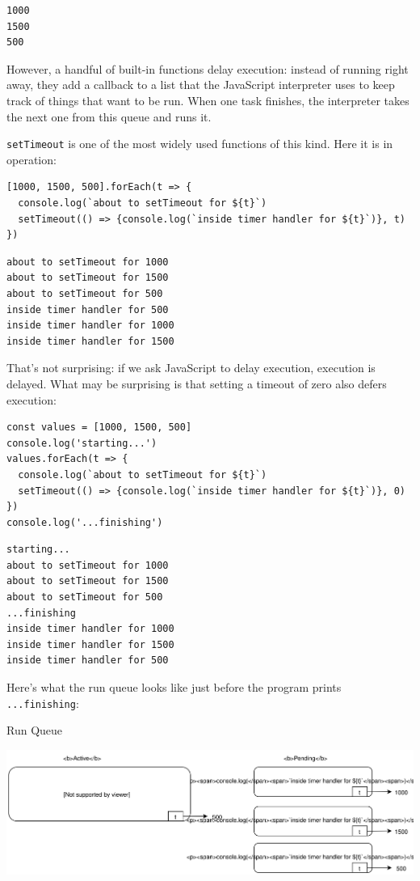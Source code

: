 \begin{verbatim}
1000
1500
500
\end{verbatim}

However, a handful of built-in functions delay execution: instead of
running right away, they add a callback to a list that the JavaScript
interpreter uses to keep track of things that want to be run. When one
task finishes, the interpreter takes the next one from this queue and
runs it.

\texttt{setTimeout} is one of the most widely used functions of this
kind. Here it is in operation:

\begin{verbatim}
[1000, 1500, 500].forEach(t => {
  console.log(`about to setTimeout for ${t}`)
  setTimeout(() => {console.log(`inside timer handler for ${t}`)}, t)
})
\end{verbatim}

\begin{verbatim}
about to setTimeout for 1000
about to setTimeout for 1500
about to setTimeout for 500
inside timer handler for 500
inside timer handler for 1000
inside timer handler for 1500
\end{verbatim}

That's not surprising: if we ask JavaScript to delay execution,
execution is delayed. What may be surprising is that setting a timeout
of zero also defers execution:

\begin{verbatim}
const values = [1000, 1500, 500]
console.log('starting...')
values.forEach(t => {
  console.log(`about to setTimeout for ${t}`)
  setTimeout(() => {console.log(`inside timer handler for ${t}`)}, 0)
})
console.log('...finishing')
\end{verbatim}

\begin{verbatim}
starting...
about to setTimeout for 1000
about to setTimeout for 1500
about to setTimeout for 500
...finishing
inside timer handler for 1000
inside timer handler for 1500
inside timer handler for 500
\end{verbatim}

Here's what the run queue looks like just before the program prints
\texttt{...finishing}:

Run Queue

\includegraphics{../../files/promises-queue.svg}

